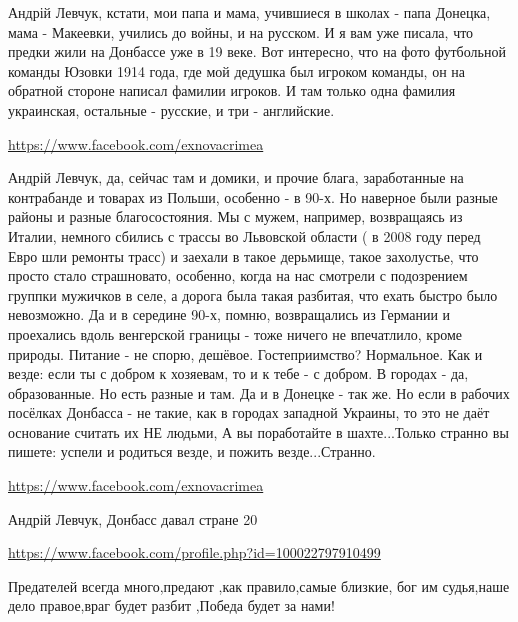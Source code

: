 \documentclass[a4paper,11pt]{extreport}
\begin{document}
\begin{itemize}
\begin{itemize}
Андрій Левчук, кстати, мои папа и мама, учившиеся в школах - папа Донецка, мама - Макеевки, учились до войны, и на русском. И я вам уже писала, что предки жили на Донбассе уже в 19 веке. Вот интересно, что на фото футбольной команды Юзовки 1914 года, где мой дедушка был игроком команды, он на обратной стороне написал фамилии игроков. И там только одна фамилия украинская, остальные - русские, и три - английские.

\url{https://www.facebook.com/exnovacrimea}

Андрій Левчук, да, сейчас там и домики, и прочие блага, заработанные на контрабанде и товарах из Польши, особенно - в 90-х. Но наверное были разные районы и разные благосостояния. Мы с мужем, например, возвращаясь из Италии, немного сбились с трассы во Львовской области ( в 2008 году перед Евро шли ремонты трасс) и заехали в такое дерьмище, такое захолустье, что просто стало страшновато, особенно, когда на нас смотрели с подозрением группки мужичков в селе, а дорога была такая разбитая, что ехать быстро было невозможно. Да и в середине 90-х, помню, возвращались из Германии и проехались вдоль венгерской границы - тоже ничего не впечатлило, кроме природы. Питание - не спорю, дешёвое. Гостеприимство? Нормальное. Как и везде: если ты с добром к хозяевам, то и к тебе - с добром. В городах - да, образованные. Но есть разные и там. Да и в Донецке - так же. Но если в рабочих посёлках Донбасса - не такие, как в городах западной Украины, то это не даёт основание считать их НЕ людьми, А вы поработайте в шахте...Только странно вы пишете: успели и родиться везде, и пожить везде...Странно.

\url{https://www.facebook.com/exnovacrimea}

Андрій Левчук, Донбасс давал стране 20%

\end{itemize}
\url{https://www.facebook.com/profile.php?id=100022797910499}

Предателей всегда много,предают ,как правило,самые близкие, бог им судья,наше дело правое,враг будет разбит ,Победа будет за нами!


\end{itemize}
\end{document}
